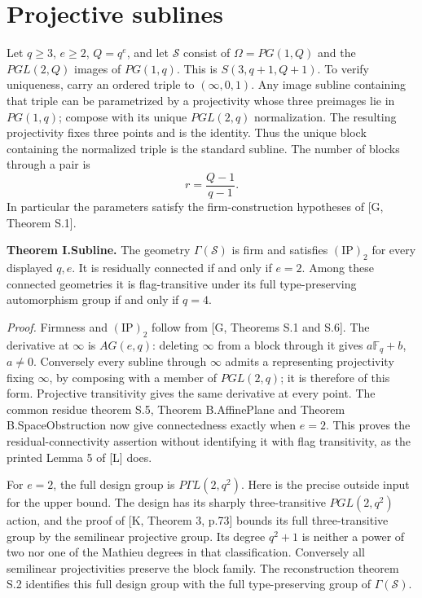 \section{Projective sublines}
Let $q\geq3$, $e\geq2$, $Q=q^e$, and let $\mathcal S$ consist of
$\Omega=PG(1,Q)$ and the $PGL(2,Q)$ images of $PG(1,q)$.
This is $S(3,q+1,Q+1)$. To verify uniqueness, carry an ordered triple to
$(\infty,0,1)$. Any image subline containing that triple can be
parametrized by a projectivity whose three preimages lie in $PG(1,q)$;
compose with its unique $PGL(2,q)$ normalization. The resulting
projectivity fixes three points and is the identity. Thus the unique
block containing the normalized triple is the standard subline.
The number of blocks through a pair is
\[
r=\frac{Q-1}{q-1}.
\]
In particular the parameters satisfy the firm-construction hypotheses
of [G, Theorem S.1].

\textbf{Theorem I.Subline.}
The geometry $\Gamma(\mathcal S)$ is firm and satisfies
$(\mathrm{IP})_2$ for every displayed $q,e$. It is residually connected
if and only if $e=2$. Among these connected geometries it is
flag-transitive under its full type-preserving automorphism group if
and only if $q=4$.

\emph{Proof.}
Firmness and $(\mathrm{IP})_2$ follow from [G, Theorems S.1 and S.6].
The derivative at $\infty$ is $AG(e,q)$: deleting $\infty$ from a block
through it gives $a\mathbb F_q+b$, $a\ne0$. Conversely every subline
through $\infty$ admits a representing projectivity fixing $\infty$,
by composing with a member of $PGL(2,q)$; it is therefore of this
form. Projective transitivity gives the same derivative at every point.
The common residue theorem S.5, Theorem B.AffinePlane and Theorem
B.SpaceObstruction now give connectedness exactly when $e=2$.
This proves the residual-connectivity assertion without identifying it
with flag transitivity, as the printed Lemma 5 of [L] does.

For $e=2$, the full design group is $P\Gamma L(2,q^2)$.
Here is the precise outside input for the upper bound. The design has
its sharply three-transitive $PGL(2,q^2)$ action, and the proof of [K,
Theorem 3, p.73] bounds its full three-transitive group by the semilinear
projective group. Its degree $q^2+1$ is neither a power of two nor one
of the Mathieu degrees in that classification. Conversely all
semilinear projectivities preserve the block family. The reconstruction
theorem S.2 identifies this full design group with the full
type-preserving group of $\Gamma(\mathcal S)$.

